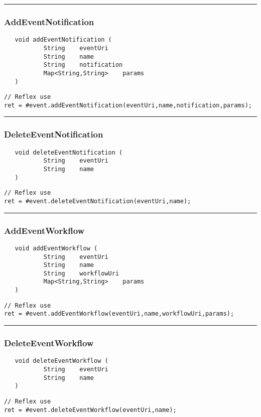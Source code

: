 \rule{15cm}{2pt}
\subsubsection{AddEventNotification}
\label{Api:AddEventNotification}
\begin{verbatim}
   void addEventNotification (
           String    eventUri
           String    name
           String    notification
           Map<String,String>    params
   )
\end{verbatim}
\begin{lstlisting}[language=reflex]
// Reflex use
ret = #event.addEventNotification(eventUri,name,notification,params);
\end{lstlisting}



\rule{15cm}{2pt}
\subsubsection{DeleteEventNotification}
\label{Api:DeleteEventNotification}
\begin{verbatim}
   void deleteEventNotification (
           String    eventUri
           String    name
   )
\end{verbatim}
\begin{lstlisting}[language=reflex]
// Reflex use
ret = #event.deleteEventNotification(eventUri,name);
\end{lstlisting}



\rule{15cm}{2pt}
\subsubsection{AddEventWorkflow}
\label{Api:AddEventWorkflow}
\begin{verbatim}
   void addEventWorkflow (
           String    eventUri
           String    name
           String    workflowUri
           Map<String,String>    params
   )
\end{verbatim}
\begin{lstlisting}[language=reflex]
// Reflex use
ret = #event.addEventWorkflow(eventUri,name,workflowUri,params);
\end{lstlisting}



\rule{15cm}{2pt}
\subsubsection{DeleteEventWorkflow}
\label{Api:DeleteEventWorkflow}
\begin{verbatim}
   void deleteEventWorkflow (
           String    eventUri
           String    name
   )
\end{verbatim}
\begin{lstlisting}[language=reflex]
// Reflex use
ret = #event.deleteEventWorkflow(eventUri,name);
\end{lstlisting}



